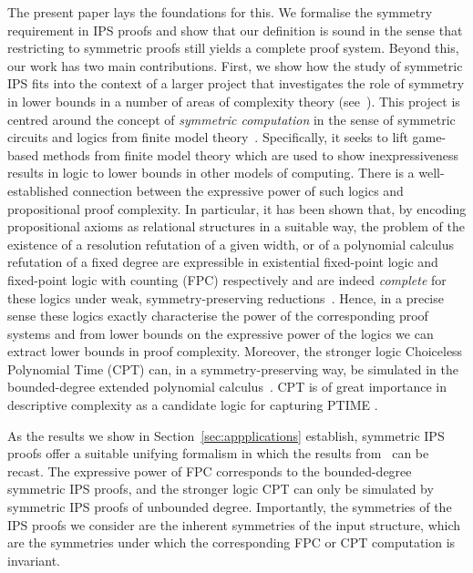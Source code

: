 \documentclass[10pt,a4paper]{article}
\begin{document}
	The present paper lays the foundations for this. We formalise the symmetry requirement in IPS proofs and show that our definition is sound in the sense that restricting to symmetric proofs still yields a complete proof system. Beyond this, our work has two main contributions. First, we show how the study of symmetric IPS fits into the context of a larger project that investigates the role of symmetry in lower bounds in a number of areas of complexity theory (see~\cite{DawarCSL20}). This project is centred around the concept of \emph{symmetric computation} in the sense of symmetric circuits and logics from finite model theory~\cite{DawarICALP24,DawarPago24}. 
	Specifically, it seeks to lift game-based methods from finite model theory which are used to show inexpressiveness results in logic to lower bounds in other models of computing. 
	There is a well-established connection between the expressive power of such logics and propositional proof complexity. In particular, it has been shown that, by encoding propositional axioms as relational structures in a suitable way, the problem of the existence of a resolution refutation of a given width, or of a polynomial calculus refutation of a fixed degree are expressible in existential fixed-point logic and fixed-point logic with counting (FPC) respectively and are indeed \emph{complete} for these logics under weak, symmetry-preserving reductions~\cite{ggpp}.  Hence, in a precise sense these logics exactly characterise the power of the corresponding proof systems and from lower bounds on the expressive power of the logics we can extract lower bounds in proof complexity. Moreover, the stronger logic Choiceless Polynomial Time (CPT)  can, in a symmetry-preserving way, be simulated in the bounded-degree extended polynomial calculus~\cite{Pago}. CPT is of great importance in descriptive complexity as a candidate logic for capturing PTIME \cite{pakusa2015linear, gradel2015polynomial}.
	
	As the results we show in Section~\ref{sec:appplications} establish, symmetric IPS proofs offer a suitable unifying formalism in which the results from~\cite{ggpp, Pago} can be recast. The expressive power of FPC corresponds to the bounded-degree symmetric IPS proofs, and the stronger logic CPT can only be simulated by symmetric IPS proofs of unbounded degree.   Importantly, the symmetries of the IPS proofs we consider are the inherent symmetries of the input structure, which are the symmetries under which the corresponding FPC or CPT computation is invariant.
	
\end{document}

